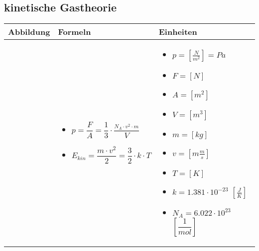 \subsection{kinetische Gastheorie}				%
	\begin{tabular}{ | m{6cm} | m{6cm} | m{6cm} | }
		\hline
		Abbildung & Formeln & Einheiten \\ \hline
		\hline
		\begin{minipage}{.3\textwidth}
			\tabImg[width=6.0cm]{images/Gastheorie}
		\end{minipage}
		&
		\begin{itemize}
			\item$p=\dfrac{F}{A}=\dfrac{1}{3}\cdot \dfrac{_{N_{A}\cdot v^{2}\cdot m}}{V}$ 
			\item$E_{kin}=\dfrac{m\cdot v^{2}}{2}=\dfrac{3}{2}\cdot k\cdot T$
			
		\end{itemize}
		& 
		\begin{itemize}
			\item $p= [\frac{N}{m^{2}}]=Pa$
			\item $F=[N]$
			\item $A=[m^2]$
			\item $V=[m^3]$
			\item $m=[kg]$
			\item $v=[m\frac{m}{s}]$
			\item $T=[K]$
			\item $k=1.381\cdot 10^{-23}$ $[\frac{J}{K}]$
			\item $N_{A}=6.022\cdot 10^{23}$ $[\dfrac{1}{mol}] $
			
		\end{itemize}
		\\ \hline
	\end{tabular}

